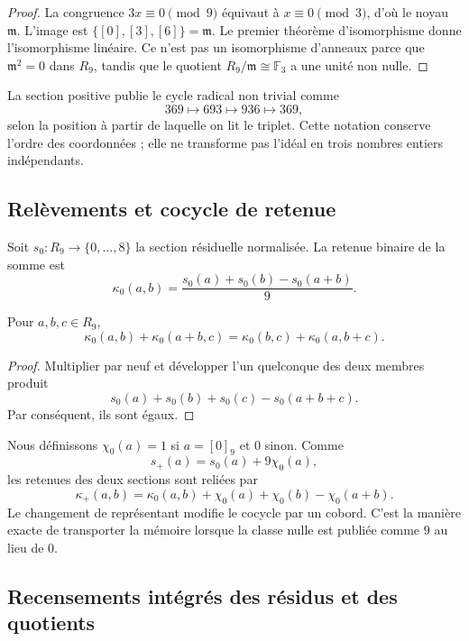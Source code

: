 \begin{proof}
La congruence \(3x\equiv0\pmod9\) équivaut à \(x\equiv0\pmod3\), d’où
le noyau \(\mathfrak m\). L’image est
\(\{[0],[3],[6]\}=\mathfrak m\). Le premier théorème d’isomorphisme donne
l’isomorphisme linéaire. Ce n’est pas un isomorphisme d’anneaux parce que
\(\mathfrak m^2=0\) dans \(R_9\), tandis que le quotient
\(R_9/\mathfrak m\cong\mathbb F_3\) a une unité non nulle.
\end{proof}

La section positive publie le cycle radical non trivial comme
\[
 369\longmapsto693\longmapsto936\longmapsto369,
\]
selon la position à partir de laquelle on lit le triplet. Cette notation conserve
l’ordre des coordonnées ; elle ne transforme pas l’idéal en trois nombres entiers
indépendants.

\subsection{Relèvements et cocycle de retenue}

Soit \(s_0:R_9\to\{0,\ldots,8\}\) la section résiduelle normalisée. La
retenue binaire de la somme est
\[
 \kappa_0(a,b)
 =\frac{s_0(a)+s_0(b)-s_0(a+b)}9.
\]

\begin{lemma}
\label{p12-83-c1-s1:lem:app-identidad-cociclo-acarreo}
Pour \(a,b,c\in R_9\),
\[
 \kappa_0(a,b)+\kappa_0(a+b,c)
 =\kappa_0(b,c)+\kappa_0(a,b+c).
\]
\end{lemma}

\begin{proof}
Multiplier par neuf et développer l’un quelconque des deux membres produit
\[
 s_0(a)+s_0(b)+s_0(c)-s_0(a+b+c).
\]
Par conséquent, ils sont égaux.
\end{proof}

Nous définissons \(\chi_0(a)=1\) si \(a=[0]_9\) et \(0\) sinon. Comme
\[
 s_+(a)=s_0(a)+9\chi_0(a),
\]
les retenues des deux sections sont reliées par
\[
 \kappa_+(a,b)=
 \kappa_0(a,b)+\chi_0(a)+\chi_0(b)-\chi_0(a+b).
\]
Le changement de représentant modifie le cocycle par un cobord. C’est la
manière exacte de transporter la mémoire lorsque la classe nulle est publiée comme
\(9\) au lieu de \(0\).

\subsection{Recensements intégrés des résidus et des quotients}

